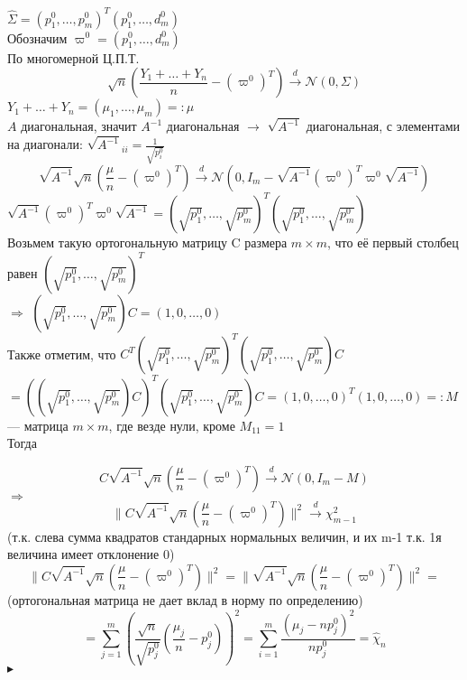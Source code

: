 \documentclass{article}
\begin{document}
$\widehat{\Sigma} = (p_1^0,\dots,p_m^0)^T(p_1^0,\dots,d_m^0)$\\
Обозначим $\varpi^0 = (p_1^0,\dots,d_m^0)$\\
По многомерной Ц.П.Т.
$$ \sqrt{n}\left(\frac{Y_1+\dots+Y_n}{n} - (\varpi^0)^T\right) \xrightarrow{d} \mathcal{N}(0,\Sigma) $$
$Y_1+\dots+Y_n = (\mu_1,\dots,\mu_m) =: \mu$\\
$A$ диагональная, значит $A^{-1}$ диагональная $\rightarrow$ $\sqrt{A^{-1}}$ диагональная, с элементами на диагонали: $\sqrt{A^{-1}}_{ii} = \frac{1}{\sqrt{p_i^0}}$\\
$$\sqrt{A^{-1}}\sqrt{n}\left(\frac{\mu}{n} - (\varpi^0)^T\right)\xrightarrow{d}\mathcal{N}(0, I_m - \sqrt{A^{-1}}(\varpi^0)^T\varpi^0\sqrt{A^{-1}}) $$
$\sqrt{A^{-1}}(\varpi^0)^T\varpi^0\sqrt{A^{-1}} = (\sqrt{p_1^0},\dots,\sqrt{p_m^0})^T(\sqrt{p_1^0},\dots,\sqrt{p_m^0})$\\
Возьмем такую ортогональную матрицу C размера $m\times m$, что её первый столбец равен $(\sqrt{p_1^0},\dots,\sqrt{p_m^0})^T$\\
$\Rightarrow$ $(\sqrt{p_1^0},\dots,\sqrt{p_m^0})C = (1,0,\dots,0)$\\

Также отметим, что $C^T(\sqrt{p_1^0},\dots,\sqrt{p_m^0})^T(\sqrt{p_1^0},\dots,\sqrt{p_m^0})C $\\$= ((\sqrt{p_1^0},\dots,\sqrt{p_m^0})C)^T(\sqrt{p_1^0},\dots,\sqrt{p_m^0})C = (1,0,\dots,0)^T(1,0,\dots,0) =: M$ \\--- матрица $m\times m$, где везде нули, кроме $M_{11} = 1$\\ 
Тогда

$$C\sqrt{A^{-1}}\sqrt{n}\left(\frac{\mu}{n} - (\varpi^0)^T\right)\xrightarrow{d}\mathcal{N}(0, I_m - M) $$
$\Rightarrow$
$$ \|C\sqrt{A^{-1}}\sqrt{n}\left(\frac{\mu}{n} - (\varpi^0)^T\right)\|^2\xrightarrow{d}\chi^2_{m-1} $$
(т.к. слева сумма квадратов стандарных нормальных величин, и их m-1 т.к. 1я величина имеет отклонение 0)\\
$$\|C\sqrt{A^{-1}}\sqrt{n}\left(\frac{\mu}{n} - (\varpi^0)^T\right)\|^2 = 
\|\sqrt{A^{-1}}\sqrt{n}\left(\frac{\mu}{n} - (\varpi^0)^T\right)\|^2 = $$ (ортогональная матрица не дает вклад в норму по определению)
$$ = \sum_{j=1}^m{\left(\frac{\sqrt{n}}{\sqrt{p_j^0}}\left(\frac{\mu_j}{n} - p_j^0   \right)   \right)^2} =   \sum_{i = 1}^m{\frac{(\mu_j - np_j^0)^2}{np_j^0}} = \widehat{\chi}_n$$
$\blacktriangleright$\\
\end{document}
